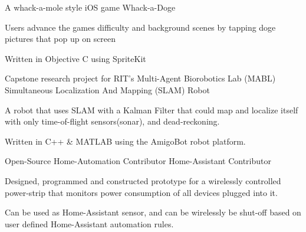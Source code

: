 \begin{cventries}

    \cventry
      {A whack-a-mole style iOS game}
      {Whack-a-Doge}
      {}
      {}
      {
        \begin{cvitems}
          \item {Users advance the games difficulty and background scenes by tapping doge pictures that pop up on screen}
          \item {Written in Objective C using SpriteKit}
        \end{cvitems}
      }


    \cventry
      {Capstone research project for RIT's Multi-Agent Biorobotics Lab (MABL)}
      {Simultaneous Localization And Mapping (SLAM) Robot}
      {}
      {}
      {
        \begin{cvitems}
          \item {A robot that uses SLAM with a Kalman Filter that could map and localize itself with only time-of-flight sensors(sonar), and dead-reckoning.}
          \item {Written in C++ \& MATLAB using the AmigoBot robot platform.}
          \end{cvitems}
      }

    \cventry
      {Open-Source Home-Automation Contributor}
      {Home-Assistant Contributor}
      {} %
      {} %
      {
        \begin{cvitems}
          \item {Designed, programmed and constructed prototype for a wirelessly controlled power-strip that monitors power consumption of all devices plugged into it.}
          \item {Can be used as Home-Assistant sensor, and can be wirelessly be shut-off based on user defined Home-Assistant automation rules.}
        \end{cvitems}
      }


\end{cventries}
